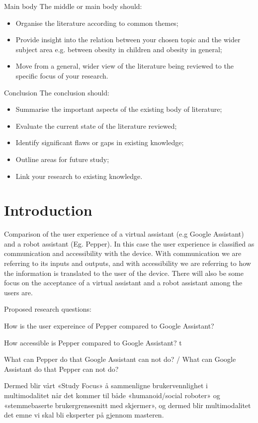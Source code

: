 \documentclass[fleqn,10pt]{wlscirep}
\begin{document}
Main body
The middle or main body should:

\begin{itemize}
    \item Organise the literature according to common themes;
    \item Provide insight into the relation between your chosen topic and the wider subject area e.g. between obesity in children and obesity in general;
    \item Move from a general, wider view of the literature being reviewed to the specific focus of your research.
\end{itemize}

Conclusion
The conclusion should:
\begin{itemize}
    \item Summarise the important aspects of the existing body of literature;
    \item Evaluate the current state of the literature reviewed;
    \item Identify significant flaws or gaps in existing knowledge;
    \item Outline areas for future study;
    \item Link your research to existing knowledge.
\end{itemize}
\newpage

\section{Introduction}
Comparison of the user experience of a virtual assistant (e.g Google Assistant) and a robot assistant (Eg. Pepper). In this case the user experience is classified as communication and accessibility with the device. With communication we are referring to its inputs and outputs, and with accessibility we are referring to how the information is translated to the user of the device. There will also be some focus on the acceptance of a virtual assistant and a robot assistant among the users are.

Proposed research questions: 

How is the user expereince of Pepper compared to Google Assistant? 

How accessible is Pepper compared to Google Assistant?  t

What can Pepper do that Google Assistant can not do? / What can Google Assistant do that Pepper can not do? 

Dermed blir vårt «Study Focus» å sammenligne brukervennlighet i multimodalitet når det kommer til både «humanoid/social roboter» og «stemmebaserte brukergrensesnitt med skjermer», og dermed blir multimodalitet det emne vi skal bli eksperter på gjennom masteren.
\end{document}
